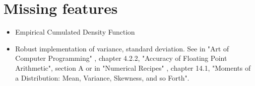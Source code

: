 \chapter{Missing features}

\begin{itemize}
\item Empirical Cumulated Density Function
\item Robust implementation of variance, standard deviation.
See in "Art of Computer Programming" \cite{artcomputerKnuthVol2}, chapter 4.2.2, "Accuracy of Floating
Point Arithmetic", section A or in "Numerical Recipes" \cite{NumericalRecipes}, 
chapter 14.1, "Moments of a Distribution: Mean, Variance, Skewness, and so Forth".
\end{itemize}

